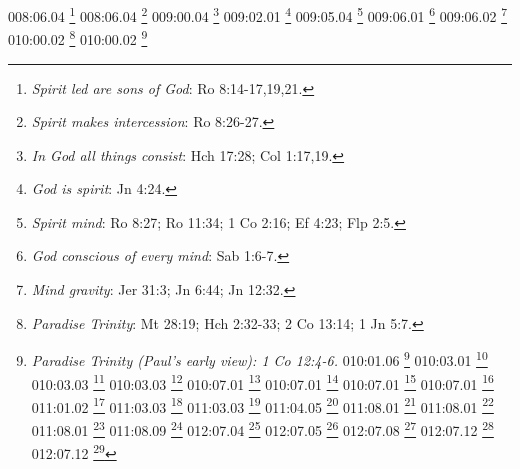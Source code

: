 {{{{{{{{{{{{{{{{{008:06.04 \footnote{\textit{Spirit led are sons of God}: Ro 8:14-17,19,21.}
008:06.04 \footnote{\textit{Spirit makes intercession}: Ro 8:26-27.}
009:00.04 \footnote{\textit{In God all things consist}: Hch 17:28; Col 1:17,19.}
009:02.01 \footnote{\textit{God is spirit}: Jn 4:24.}
009:05.04 \footnote{\textit{Spirit mind}: Ro 8:27; Ro 11:34; 1 Co 2:16; Ef 4:23; Flp 2:5.}
009:06.01 \footnote{\textit{God conscious of every mind}: Sab 1:6-7.}
009:06.02 \footnote{\textit{Mind gravity}: Jer 31:3; Jn 6:44; Jn 12:32.}
010:00.02 \footnote{\textit{Paradise Trinity}: Mt 28:19; Hch 2:32-33; 2 Co 13:14; 1 Jn 5:7.}
010:00.02 \footnote{\textit{Paradise Trinity (Paul's early view): 1 Co 12:4-6.}
010:01.06 \footnote{\textit{Paradise Sons}: Mt 11:27; Lc 10:22; Jn 1:14,18; Jn 6:45-46; Jn 8:26; Jn 12:49-50; Jn 14:7-11,20; Jn 17:6,25-26.}
010:03.01 \footnote{\textit{Made man in God's image}: Gn 1:26.}
010:03.03 \footnote{\textit{"Word" of God}: Jn 1:1-4,14.}
010:03.03 \footnote{\textit{Act of God}: Gn 1:1ff.}
010:07.01 \footnote{\textit{Alpha & Omega}: Ap 1:8,11; Ap 21:6; Ap 22:13.}
010:07.01 \footnote{\textit{First, Last, and only God}: Is 41:4; Is 44:6; Is 48:12; Ap 1:17; Ap 2:8.}
010:07.01 \footnote{\textit{The Lord our God is one God}: 2 Re 19:19; 1 Cr 17:20; Neh 9:6; Sal 86:10; Eclo 36:5; Is 37:16; Is 44:6,8; Is 45:5-6,21; Dt 4:35,39; Dt 6:4; Mc 12:29,32; Jn 17:3; Ro 3:30; 1 Co 8:4-6; Gl 3:20; Ef 4:6; 1 Ti 2:5; Stg 2:19; 1 Sam 2:2; 2 Sam 7:22.}
010:07.01 \footnote{\textit{Unity of Deity}: 1 Jn 5:7.}
011:01.02 \footnote{\textit{High & holy place}: Is 57:15.}
011:03.03 \footnote{\textit{Father's house}: Jn 2:16.}
011:03.03 \footnote{\textit{Many mansions}: Jn 14:2.}
011:04.05 \footnote{\textit{Eye not seen nor ear heard}: Is 64:4; 1 Co 2:9.}
011:08.01 \footnote{\textit{God fills all things}: Ef 4:10.}
011:08.01 \footnote{\textit{God is all things}: Hch 17:24,28; 1 Co 8:6.}
011:08.01 \footnote{\textit{In God all things consist}: Hch 17:22-25,28; Ro 11:36; 1 Co 8:6; Ef 4:10; Col 1:17.}
011:08.09 \footnote{\textit{Spirit gravity}: Jer 31:3; Jn 6:44; Jn 12:32.}
012:07.04 \footnote{\textit{In God no variableness}: Stg 1:17.}
012:07.05 \footnote{\textit{God changes not}: Mal 3:6.}
012:07.08 \footnote{\textit{God is no respecter of persons}: 2 Cr 19:7; Job 34:19; Eclo 35:12; Hch 10:34; Ro 2:11; Gl 2:6; Gl 3:28; Ef 6:9; Col 3:11.}
012:07.12 \footnote{\textit{God dwells in us}: Job 32:8,18; Is 63:10-11; Ez 37:14; Mt 10:20; Lc 17:21; Jn 17:21-23; Ro 8:9-11; 1 Co 3:16-17; 1 Co 6:19; 2 Co 6:16; Gl 2:20; 1 Jn 3:24; 1 Jn 4:12; Ap 21:3.}
012:07.12 \footnote{\textit{God not far}: Hch 17:27.}
}}}}}}}}}}}}}}}}}}
